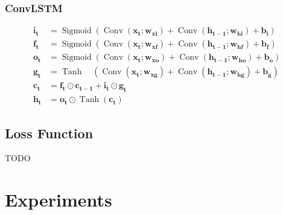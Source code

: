 \documentclass[final]{cvpr}
\begin{document}
\subsubsection{ConvLSTM}

\begin{equation}
    \begin{aligned}
        \mathbf{i}_{\mathbf{t}} & = \operatorname{Sigmoid}\left(\operatorname{Conv}\left(\mathbf{x}_{\mathbf{t}} ; \mathbf{w}_{\mathbf{x i}}\right)+\operatorname{Conv}\left(\mathbf{h}_{\mathbf{t}-\mathbf{1}} ; \mathbf{w}_{\mathbf{h i}}\right)+\mathbf{b}_{\mathbf{i}}\right)    \\
        \mathbf{f}_{\mathbf{t}} & = \operatorname{Sigmoid}\left(\operatorname{Conv}\left(\mathbf{x}_{\mathbf{t}} ; \mathbf{w}_{\mathbf{x f}}\right)+\operatorname{Conv}\left(\mathbf{h}_{\mathbf{t}-\mathbf{1}} ; \mathbf{w}_{\mathbf{h f}}\right)+\mathbf{b}_{\mathbf{f}}\right)    \\
        \mathbf{o}_{\mathbf{t}} & = \operatorname{Sigmoid}\left(\operatorname{Conv}\left(\mathbf{x}_{\mathbf{t}} ; \mathbf{w}_{\mathbf{x o}}\right)+\operatorname{Conv}\left(\mathbf{h}_{\mathbf{t}-\mathbf{1}} ; \mathbf{w}_{\mathbf{h o}}\right)+\mathbf{b}_{\mathbf{o}}\right)    \\
        \mathbf{g}_{\mathbf{t}} & = \operatorname{Tanh} \quad\left(\operatorname{Conv}\left(\mathbf{x}_{\mathbf{t}} ; \mathbf{w}_{\mathbf{x g}}\right)+\operatorname{Conv}\left(\mathbf{h}_{\mathbf{t}-\mathbf{1}} ; \mathbf{w}_{\mathbf{h g}}\right)+\mathbf{b}_{\mathbf{g}}\right) \\
        \mathbf{c}_{\mathbf{t}} & = \mathbf{f}_{\mathbf{t}} \odot \mathbf{c}_{\mathbf{t}-\mathbf{1}}+\mathbf{i}_{\mathbf{t}} \odot \mathbf{g}_{\mathbf{t}}                                                                                                                           \\
        \mathbf{h}_{\mathbf{t}} & = \mathbf{o}_{\mathbf{t}} \odot \operatorname{Tanh}\left(\mathbf{c}_{\mathbf{t}}\right)
    \end{aligned}
\end{equation}\label{convLSTM}


\subsection{Loss Function}

TODO

\section{Experiments}
\end{document}

